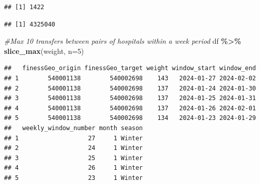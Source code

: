 \documentclass[
]{article}
\newenvironment{Shaded}{\begin{snugshade}}{\end{snugshade}}
\newcommand{\AttributeTok}[1]{\textcolor[rgb]{0.13,0.29,0.53}{#1}}
\newcommand{\CommentTok}[1]{\textcolor[rgb]{0.56,0.35,0.01}{\textit{#1}}}
\newcommand{\DecValTok}[1]{\textcolor[rgb]{0.00,0.00,0.81}{#1}}
\newcommand{\FunctionTok}[1]{\textcolor[rgb]{0.13,0.29,0.53}{\textbf{#1}}}
\newcommand{\NormalTok}[1]{#1}
\newcommand{\OtherTok}[1]{\textcolor[rgb]{0.56,0.35,0.01}{#1}}
\newcommand{\SpecialCharTok}[1]{\textcolor[rgb]{0.81,0.36,0.00}{\textbf{#1}}}
\begin{document}
\begin{Shaded}
\end{Shaded}

\begin{verbatim}
## [1] 1422
\end{verbatim}

\begin{Shaded}
\end{Shaded}

\begin{verbatim}
## [1] 4325040
\end{verbatim}

\begin{Shaded}
\begin{Highlighting}[]
\CommentTok{\#Max 10 transfers between pairs of hospitals within a week period}
\NormalTok{df }\SpecialCharTok{\%\textgreater{}\%}  \FunctionTok{slice\_max}\NormalTok{(weight, }\AttributeTok{n=}\DecValTok{5}\NormalTok{)}
\end{Highlighting}
\end{Shaded}

\begin{verbatim}
##   finessGeo_origin finessGeo_target weight window_start window_end
## 1        540001138        540002698    143   2024-01-27 2024-02-02
## 2        540001138        540002698    137   2024-01-24 2024-01-30
## 3        540001138        540002698    137   2024-01-25 2024-01-31
## 4        540001138        540002698    137   2024-01-26 2024-02-01
## 5        540001138        540002698    134   2024-01-23 2024-01-29
##   weekly_window_number month season
## 1                   27     1 Winter
## 2                   24     1 Winter
## 3                   25     1 Winter
## 4                   26     1 Winter
## 5                   23     1 Winter
\end{verbatim}
\end{document}
